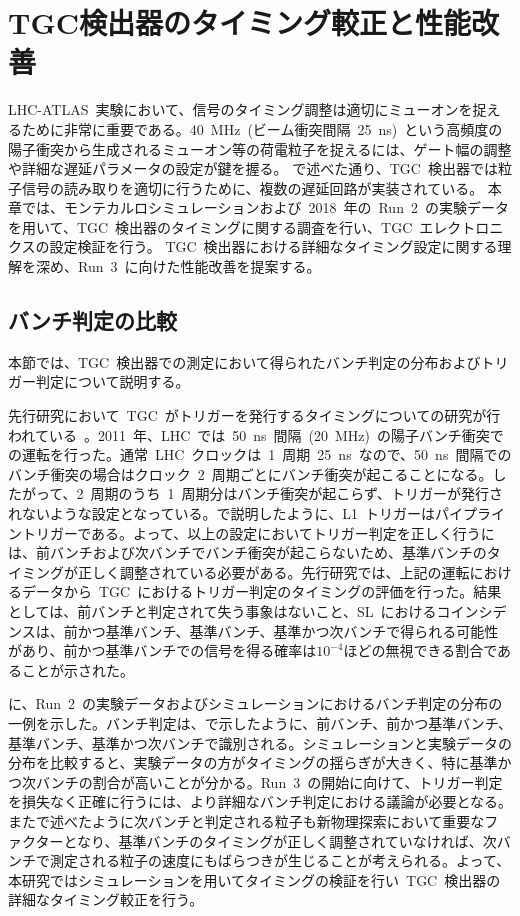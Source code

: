 \chapter{TGC検出器のタイミング較正と性能改善}
\thispagestyle{empty}
\label{chap:5}
LHC-ATLAS~実験において、信号のタイミング調整は適切にミューオンを捉えるために非常に重要である。40~MHz~(ビーム衝突間隔~25~ns)~という高頻度の陽子衝突から生成されるミューオン等の荷電粒子を捉えるには、ゲート幅の調整や詳細な遅延パラメータの設定が鍵を握る。
で述べた通り、TGC~検出器では粒子信号の読み取りを適切に行うために、複数の遅延回路が実装されている。
本章では、モンテカルロシミュレーションおよび~2018~年の~Run~2~の実験データを用いて、TGC~検出器のタイミングに関する調査を行い、TGC~エレクトロニクスの設定検証を行う。
TGC~検出器における詳細なタイミング設定に関する理解を深め、Run~3~に向けた性能改善を提案する。

\section{バンチ判定の比較}
本節では、TGC~検出器での測定において得られたバンチ判定の分布およびトリガー判定について説明する。

先行研究において~TGC~がトリガーを発行するタイミングについての研究が行われている~\cite{MT:05}。2011~年、LHC~では~50~ns~間隔~(20~MHz)~の陽子バンチ衝突での運転を行った。通常~LHC~クロックは~1~周期~25~ns~なので、50~ns~間隔でのバンチ衝突の場合はクロック~2~周期ごとにバンチ衝突が起こることになる。したがって、2~周期のうち~1~周期分はバンチ衝突が起こらず、トリガーが発行されないような設定となっている。で説明したように、L1~トリガーはパイプライントリガーである。よって、以上の設定においてトリガー判定を正しく行うには、前バンチおよび次バンチでバンチ衝突が起こらないため、基準バンチのタイミングが正しく調整されている必要がある。先行研究では、上記の運転におけるデータから~TGC~におけるトリガー判定のタイミングの評価を行った。結果としては、前バンチと判定されて失う事象はないこと、SL~におけるコインシデンスは、前かつ基準バンチ、基準バンチ、基準かつ次バンチで得られる可能性があり、前かつ基準バンチでの信号を得る確率は$10^{-4}$ほどの無視できる割合であることが示された。

に、Run~2~の実験データおよびシミュレーションにおけるバンチ判定の分布の一例を示した。バンチ判定は、で示したように、前バンチ、前かつ基準バンチ、基準バンチ、基準かつ次バンチで識別される。シミュレーションと実験データの分布を比較すると、実験データの方がタイミングの揺らぎが大きく、特に基準かつ次バンチの割合が高いことが分かる。Run~3~の開始に向けて、トリガー判定を損失なく正確に行うには、より詳細なバンチ判定における議論が必要となる。またで述べたように次バンチと判定される粒子も新物理探索において重要なファクターとなり、基準バンチのタイミングが正しく調整されていなければ、次バンチで測定される粒子の速度にもばらつきが生じることが考えられる。よって、本研究ではシミュレーションを用いてタイミングの検証を行い~TGC~検出器の詳細なタイミング較正を行う。

